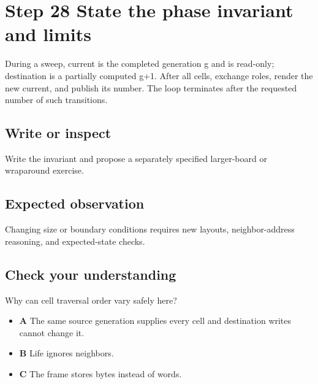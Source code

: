 \section{Step 28 State the phase invariant and
  limits}\label{008-life-generations-s28-step-28-state-the-phase-invariant-and-limits}

During a sweep, current is the completed generation g and is read-only;
destination is a partially computed g+1. After all cells, exchange
roles, render the new current, and publish its number. The loop
terminates after the requested number of such transitions.

\subsection{Write or
  inspect}\label{008-life-generations-s28-write-or-inspect}

Write the invariant and propose a separately specified larger-board or
wraparound exercise.

\subsection{Expected
  observation}\label{008-life-generations-s28-expected-observation}

Changing size or boundary conditions requires new layouts,
neighbor-address reasoning, and expected-state checks.

\subsection{Check your
  understanding}\label{008-life-generations-s28-check-your-understanding}

Why can cell traversal order vary safely here?

\begin{itemize}
  \tightlist
  \item
        \textbf{A} The same source generation supplies every cell and
        destination writes cannot change it.
  \item
        \textbf{B} Life ignores neighbors.
  \item
        \textbf{C} The frame stores bytes instead of words.
\end{itemize}
